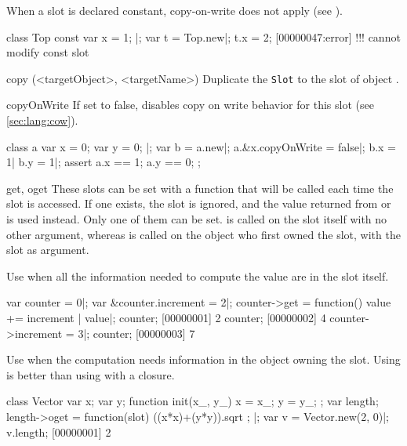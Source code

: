\begin{urbiscriptapi}
When a slot is declared constant, copy-on-write does not apply (see
).

\begin{urbiscript}
class Top
{
  const var x = 1;
}|;
var t = Top.new|;
t.x = 2;
[00000047:error] !!! cannot modify const slot
\end{urbiscript}


\item[copy](<targetObject>, <targetName>)%
  Duplicate the \lstinline|Slot| to the slot  of object
  .

\item[copyOnWrite]%
  If set to false, disables copy on write behavior for this slot
  (see \autoref{sec:lang:cow}).

\begin{urbiscript}
class a {
  var x = 0;
  var y = 0;
}|;
var b = a.new|;
a.&x.copyOnWrite = false|;
b.x = 1| b.y = 1|;
assert
{
  a.x == 1;
  a.y == 0;
};
\end{urbiscript}

\item[get, oget]%
  These slots can be set with a function that will be called each time the slot
  is accessed. If one exists, the  slot is ignored, and the
  value returned from  or  is used instead.
  Only one of them can be set.  is called on the slot itself with
  no other argument, whereas  is called on the object who first
  owned the slot, with the slot as argument.

  Use  when all the information needed to compute the value are
  in the slot itself.

\begin{urbiscript}
var counter = 0|;
var &counter.increment = 2|;
counter->get = function()
{ value += increment | value}|;
counter;
[00000001] 2
counter;
[00000002] 4
counter->increment = 3|;
counter;
[00000003] 7
\end{urbiscript}

Use  when the computation needs information in the object
owning the slot. Using  is better than using  with
a closure.

\begin{urbiscript}
class Vector
{
  var x;
  var y;
  function init(x_, y_)
  {
    x = x_;
    y = y_;
  };
  var length;
  length->oget = function(slot)
  {
    ((x*x)+(y*y)).sqrt
  };
}|;
var v = Vector.new(2, 0)|;
v.length;
[00000001] 2
\end{urbiscript}


\end{urbiscriptapi}
